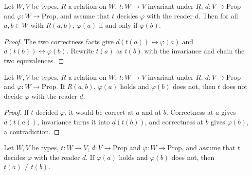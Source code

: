\begin{theorem}
  \label{thm:barriers-curie}
  \leanok
  Let $W, V$ be types, $R$ a relation on $W$, $t : W \to V$ invariant under $R$, $d : V \to
  \mathrm{Prop}$ and $\varphi : W \to \mathrm{Prop}$, and assume that $t$ decides $\varphi$ with the
  reader $d$. Then for all $a, b \in W$ with $R(a,b)$, $\varphi(a)$ if and only if $\varphi(b)$.
  \own{}
\end{theorem}

\begin{proof}
  \leanok
  The two correctness facts give $d(t(a)) \leftrightarrow \varphi(a)$ and $d(t(b)) \leftrightarrow
  \varphi(b)$. Rewrite $t(a)$ as $t(b)$ with the invariance and chain the two equivalences.
\end{proof}

\begin{theorem}
  \label{thm:barriers-curie-no-decide}
  \leanok
  Let $W, V$ be types, $R$ a relation on $W$, $t : W \to V$ invariant under $R$, $d : V \to
  \mathrm{Prop}$ and $\varphi : W \to \mathrm{Prop}$. If $R(a,b)$, $\varphi(a)$ holds and
  $\varphi(b)$ does not, then $t$ does not decide $\varphi$ with the reader $d$.
  \own{}
\end{theorem}

\begin{proof}
  \leanok
  If $t$ decided $\varphi$, it would be correct at $a$ and at $b$. Correctness at $a$ gives
  $d(t(a))$, invariance turns it into $d(t(b))$, and correctness at $b$ gives $\varphi(b)$, a
  contradiction.
\end{proof}

\begin{theorem}
  \label{thm:barriers-decide-separa}
  \leanok
  Let $W, V$ be types, $t : W \to V$, $d : V \to \mathrm{Prop}$ and $\varphi : W \to \mathrm{Prop}$,
  and assume that $t$ decides $\varphi$ with the reader $d$. If $\varphi(a)$ holds and $\varphi(b)$
  does not, then $t(a) \ne t(b)$.
  \own{}
\end{theorem}

